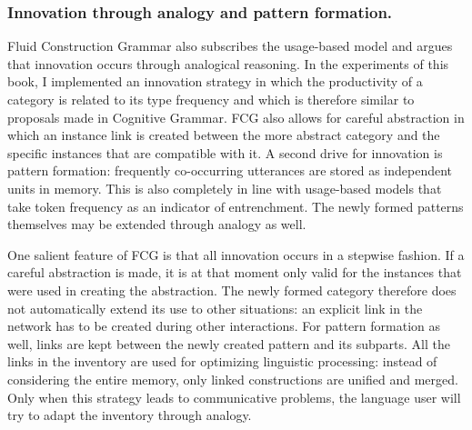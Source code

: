\subsubsection{Innovation through analogy and pattern formation.}
Fluid Construction Grammar also subscribes the usage-based model and argues that innovation occurs through analogical reasoning. In the experiments of this book, I implemented an innovation strategy in which the productivity of a category is related to its type frequency and which is therefore similar to proposals made in Cognitive Grammar. FCG also allows for careful abstraction in which an instance link is created between the more abstract category and the specific instances that are compatible with it. A second drive for innovation is pattern formation: frequently co-occurring utterances are stored as independent units in memory. This is also completely in line with usage-based models that take token frequency as an indicator of entrenchment. The newly formed patterns themselves may be extended through analogy as well.

One salient feature of FCG is that all innovation occurs in a stepwise fashion. If a careful abstraction is made, it is at that moment only valid for the instances that were used in creating the abstraction. The newly formed category therefore does not automatically extend its use to other situations: an explicit link in the network has to be created during other interactions. For pattern formation as well, links are kept between the newly created pattern and its subparts. All the links in the inventory are used for optimizing linguistic processing: instead of considering the entire memory, only linked constructions are unified and merged. Only when this strategy leads to communicative problems, the language user will try to adapt the inventory through analogy.


